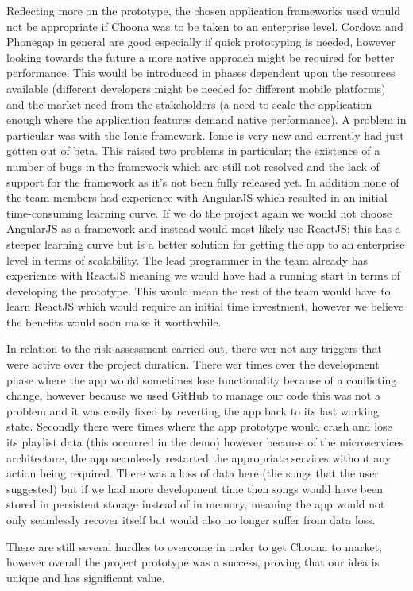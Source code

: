 Reflecting more on the prototype, the chosen application frameworks used would not be appropriate if Choona was to be taken to an enterprise level. Cordova and Phonegap in general are good especially if quick prototyping is needed, however looking towards the future a more native approach might be required for better performance. This would be introduced in phases dependent upon the resources available (different developers might be needed for different mobile platforms) and the market need from the stakeholders (a need to scale the application enough where the application features demand native performance). A problem in particular was with the Ionic framework. Ionic is very new and currently had just gotten out of beta. This raised two problems in particular; the existence of a number of bugs in the framework which are still not resolved and the lack of support for the framework as it's not been fully released yet. In addition none of the team members had experience with AngularJS which resulted in an initial time-consuming learning curve. If we do the project again we would not choose AngularJS as a framework and instead would most likely use ReactJS; this has a steeper learning curve but is a better solution for getting the app to an enterprise level in terms of scalability. The lead programmer in the team already has experience with ReactJS meaning we would have had a running start in terms of developing the prototype. This would mean the rest of the team would have to learn ReactJS which would require an initial time investment, however we believe the benefits would soon make it worthwhile.

In relation to the risk assessment carried out, there wer not any triggers that were active over the project duration. There wer times over the development phase where the app would sometimes lose functionality because of a conflicting change, however because we used GitHub to manage our code this was not a problem and it was easily fixed by reverting the app back to its last working state. Secondly there were times where the app prototype would crash and lose its playlist data (this occurred in the demo) however because of the microservices architecture, the app seamlessly restarted the appropriate services without any action being required. There was a loss of data here (the songs that the user suggested) but if we had more development time then songs would have been stored in persistent storage instead of in memory, meaning the app would not only seamlessly recover itself but would also no longer suffer from data loss.

There are still several hurdles to overcome in order to get Choona to market, however overall the project prototype was a success, proving that our idea is unique and has significant value.